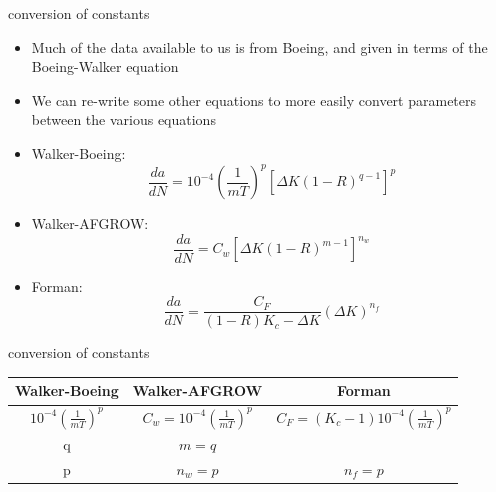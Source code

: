 \documentclass[10pt]{beamer}
\begin{document}
\begin{frame}{conversion of constants}
	\begin{itemize}[<+->]
		\item Much of the data available to us is from Boeing, and given in terms of the Boeing-Walker equation
		\item We can re-write some other equations to more easily convert parameters between the various equations
		\item Walker-Boeing:
		\begin{equation}
		\frac{da}{dN} = 10^{-4}\left(\frac{1}{mT}\right)^p\left[\Delta K(1-R)^{q-1}\right]^p
		\end{equation}
		\item Walker-AFGROW:
		\begin{equation}
		\frac{da}{dN} = C_w\left[\Delta K(1-R)^{m-1}\right]^{n_w}
		\end{equation}
		\item Forman:
		\begin{equation}
		\frac{da}{dN} = \frac{C_F}{(1-R)K_c - \Delta K} (\Delta K)^{n_f}
		\end{equation}
	\end{itemize}
\end{frame}

\begin{frame}{conversion of constants}
	\begin{tabular}{ccc}
	Walker-Boeing	& Walker-AFGROW & Forman \\ 
	\hline
	$10^{-4}\left(\frac{1}{mT}\right)^p$	& $C_w = 10^{-4}\left(\frac{1}{mT}\right)^p$ & $C_F = (K_c-1)10^{-4}\left(\frac{1}{mT}\right)^p$ \\ 
	q	& $m=q$ &  \\ 
	p	& $n_w = p$ & $n_f = p$ \\ 
	\end{tabular} 
\end{frame}
\end{document}
